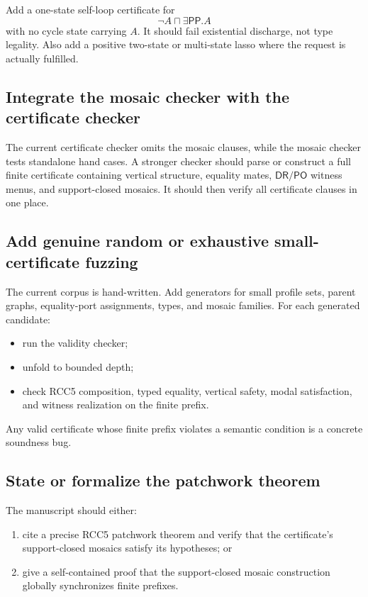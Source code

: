 \documentclass[11pt]{article}
\newcommand{\PP}{\mathsf{PP}}
\newcommand{\PO}{\mathsf{PO}}
\newcommand{\DR}{\mathsf{DR}}
\begin{document}
Add a one-state self-loop certificate for
\[
\neg A\sqcap\exists\PP.A
\]
with no cycle state carrying \(A\).  It should fail existential discharge, not type legality.  Also add a positive two-state or multi-state lasso where the request is actually fulfilled.

\subsection{Integrate the mosaic checker with the certificate checker}

The current certificate checker omits the mosaic clauses, while the mosaic checker tests standalone hand cases.  A stronger checker should parse or construct a full finite certificate containing vertical structure, equality mates, \(\DR/\PO\) witness menus, and support-closed mosaics.  It should then verify all certificate clauses in one place.

\subsection{Add genuine random or exhaustive small-certificate fuzzing}

The current corpus is hand-written.  Add generators for small profile sets, parent graphs, equality-port assignments, types, and mosaic families.  For each generated candidate:
\begin{itemize}
\item run the validity checker;
\item unfold to bounded depth;
\item check RCC5 composition, typed equality, vertical safety, modal satisfaction, and witness realization on the finite prefix.
\end{itemize}
Any valid certificate whose finite prefix violates a semantic condition is a concrete soundness bug.

\subsection{State or formalize the patchwork theorem}

The manuscript should either:
\begin{enumerate}
\item cite a precise RCC5 patchwork theorem and verify that the certificate's support-closed mosaics satisfy its hypotheses; or
\item give a self-contained proof that the support-closed mosaic construction globally synchronizes finite prefixes.
\end{enumerate}
\end{document}
